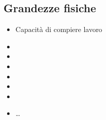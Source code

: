 \documentclass[letterpaper,10pt,italian]{jupyterBook}
\begin{document}
\subsection{Grandezze fisiche}
\label{\detokenize{ch/thermodynamics/foundation-vocabulary:grandezze-fisiche}}\begin{itemize}
\item {} 
\sphinxAtStartPar
{} Capacità di compiere lavoro

\item {} 
\sphinxAtStartPar
{}

\item {} 
\sphinxAtStartPar
{}

\item {} 
\sphinxAtStartPar
{}

\item {} 
\sphinxAtStartPar
{}

\item {} 
\sphinxAtStartPar
{}

\item {} 
\sphinxAtStartPar
{}

\item {} 
\sphinxAtStartPar
…

\end{itemize}
\end{document}
